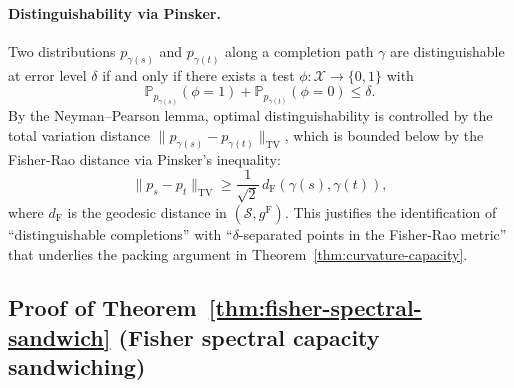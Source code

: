 \documentclass[11pt]{article}
\newcommand{\Prob}{\mathbb{P}}
\newcommand{\gF}{g^{\mathrm{F}}}
\theoremstyle{remark}
\begin{document}
\paragraph{Distinguishability via Pinsker.}
Two distributions $p_{\gamma(s)}$ and
$p_{\gamma(t)}$ along a completion path $\gamma$ are distinguishable at error level $\delta$
if and only if there exists a test $\phi : \mathcal{X} \to \{0,1\}$ with
\[
\Prob_{p_{\gamma(s)}}(\phi = 1) + \Prob_{p_{\gamma(t)}}(\phi = 0) \le \delta.
\]
By the Neyman--Pearson lemma, optimal distinguishability is controlled by the
total variation distance $\|p_{\gamma(s)} - p_{\gamma(t)}\|_{\mathrm{TV}}$,
which is bounded below by the Fisher-Rao distance via Pinsker's inequality:
\begin{equation}\label{eq:pinsker}
\|p_s - p_t\|_{\mathrm{TV}} \ge \frac{1}{\sqrt{2}}\,
d_{\mathrm{F}}(\gamma(s), \gamma(t)),
\end{equation}
where $d_{\mathrm{F}}$ is the geodesic distance in $(\mathcal{S}, \gF)$.
This justifies the identification of ``distinguishable completions'' with
``$\delta$-separated points in the Fisher-Rao metric'' that underlies the
packing argument in Theorem~\ref{thm:curvature-capacity}.

\subsection{Proof of Theorem~\ref{thm:fisher-spectral-sandwich}
(Fisher spectral capacity sandwiching)}
\label{subsec:proof-spectral-sandwich}
\end{document}
